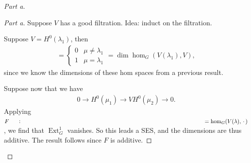 \begin{proof}[Part a]

\begin{proof}[Part a]

Suppose \(V\) has a good filtration. Idea: induct on the filtration.

Suppose \(V = H^0(\lambda_1)\), then
\begin{align*}   [V: H^0(\mu) ] =  \begin{cases} 0 & \mu \neq \lambda_1 \\ 1 & \mu = \lambda_1 \end{cases} = \dim \hom_G(V(\lambda_1), V) ,\end{align*}
since we know the dimensions of these hom spaces from a previous result.

Suppose now that we have
\begin{align*}   0 \to H^0(\mu_1) \to V H^0(\mu_2) \to 0 .\end{align*}
Applying \(F \mathrel{\vcenter{:}}=\hom_G(V(\lambda), {\,\cdot\,})\), we
find that \(\operatorname{Ext}^1_G\) vanishes. So this leads a SES, and
the dimensions are thus additive. The result follows since \(F\) is
additive.

\end{proof}

\end{proof}

